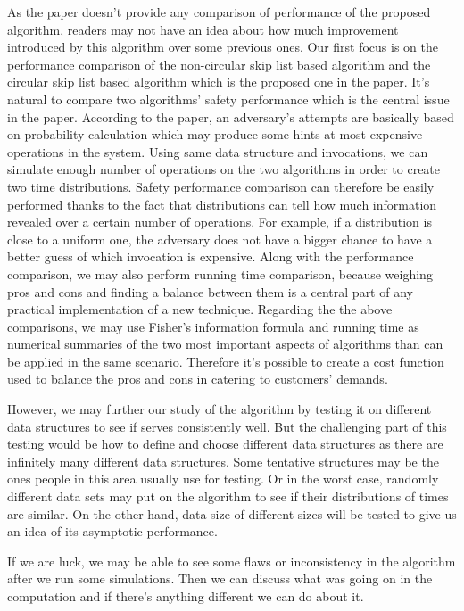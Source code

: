\documentclass[11pt,twocolumn]{article}
\begin{document}
As the paper doesn't provide any comparison of performance of the proposed algorithm, readers may not have an idea about how much improvement introduced by this algorithm over some previous ones. Our first focus is on the performance comparison of the non-circular skip list based algorithm and the circular skip list based algorithm which is the proposed one in the paper. It's natural to compare two algorithms' safety performance which is the central issue in the paper. According to the paper, an adversary's attempts are basically based on probability calculation which may produce some hints at most expensive operations in the system. Using same data structure and invocations, we can simulate enough number of operations on the two algorithms in order to create two time distributions. Safety performance comparison can therefore be easily performed thanks to the fact that distributions can tell how much information revealed over a certain number of operations. For example, if a distribution is close to a uniform one, the adversary does not have a bigger chance to have a  better guess of which invocation is expensive. Along with the performance comparison, we may also perform running time comparison, because weighing pros and cons and finding a balance between them is a central part of any practical implementation of a new technique. Regarding the the above comparisons, we may use Fisher's information formula and running time as numerical summaries of the two most important aspects of algorithms than can be applied in the same scenario. Therefore it's possible to create  a cost function used to balance the pros and cons in catering to customers' demands. 

However, we may further our study of the algorithm by testing it on different data structures to see if serves  consistently well. But the challenging part of this testing would be how to define and choose different data structures as there are infinitely many different data structures. Some tentative structures may be the ones people in this area usually use for testing. Or in the worst case, randomly different data sets  may put on the algorithm to see if their distributions of times are similar. On the other hand, data size of different sizes will be tested to give us an idea of its asymptotic performance. 

If we are luck, we may be able to see some flaws or inconsistency in the algorithm after we run some simulations. Then we can discuss what was going on in the computation and if there's anything different we can do about it.
\end{document}
